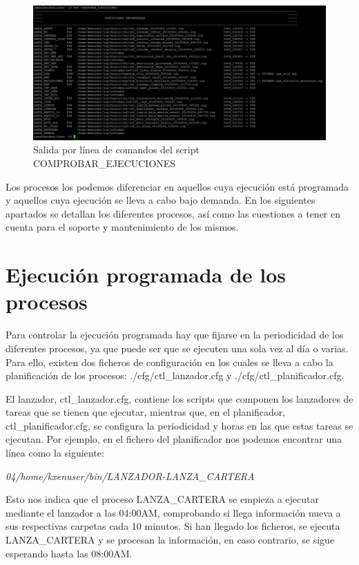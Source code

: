 \documentclass[a4paper, 12pt]{book}
\begin{document}
\begin{figure}
  \centering
  \includegraphics[width=16cm, keepaspectratio]{img/comprobar_ejecuciones}
  \caption{Salida por línea de comandos del script COMPROBAR\_EJECUCIONES}
  \label{fig:comprobar_ejecuciones}
\end{figure}

Los procesos los podemos diferenciar en aquellos cuya ejecución está programada y aquellos cuya ejecución se lleva a cabo bajo demanda. En los siguientes apartados se detallan los diferentes procesos, así como las cuestiones a tener en cuenta para el soporte y mantenimiento de los mismos.

\section{Ejecución programada de los procesos} 
\label{sec:ejecucion_programada}
Para controlar la ejecución programada hay que fijarse en la periodicidad de los diferentes procesos, ya que puede ser que se ejecuten una sola vez al día o varias. Para ello, existen dos ficheros de configuración en los cuales se lleva a cabo la planificación de los procesos: ./cfg/ctl\_lanzador.cfg y ./cfg/ctl\_planificador.cfg.

El lanzador, ctl\_lanzador.cfg, contiene los scripts que componen los lanzadores de tareas que se tienen que ejecutar, mientras que, en el planificador, ctl\_planificador.cfg, se configura la periodicidad y horas en las que estas tareas se ejecutan. Por ejemplo, en el fichero del planificador nos podemos encontrar una línea como la siguiente:
\begin{center}
	\textit{04\textbar/home/kxenuser/bin/LANZADOR-LANZA\_CARTERA}
\end{center}

Esto nos indica que el proceso LANZA\_CARTERA se empieza a ejecutar mediante el lanzador a las 04:00AM, comprobando si llega información nueva a sus respectivas carpetas cada 10 minutos. Si han llegado los ficheros, se ejecuta LANZA\_CARTERA y se procesan la información, en caso contrario, se sigue esperando hasta las 08:00AM.
\end{document}
